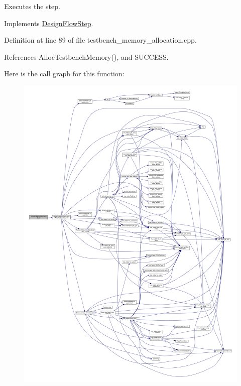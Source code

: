 Executes the step. 



Implements \hyperlink{classDesignFlowStep_a77d7e38493016766098711ea24f60b89}{Design\+Flow\+Step}.



Definition at line 89 of file testbench\+\_\+memory\+\_\+allocation.\+cpp.



References Alloc\+Testbench\+Memory(), and S\+U\+C\+C\+E\+SS.

Here is the call graph for this function\+:
\nopagebreak
\begin{figure}[H]
\begin{center}
\leavevmode
\includegraphics[width=350pt]{dc/d25/classTestbenchMemoryAllocation_a043da976f1d68793e6c264fb105eb7e9_cgraph}
\end{center}
\end{figure}
\mbox{\label{classTestbenchMemoryAllocation_a5546b24f116a6d0b3cba059d096ab2c6}} 
